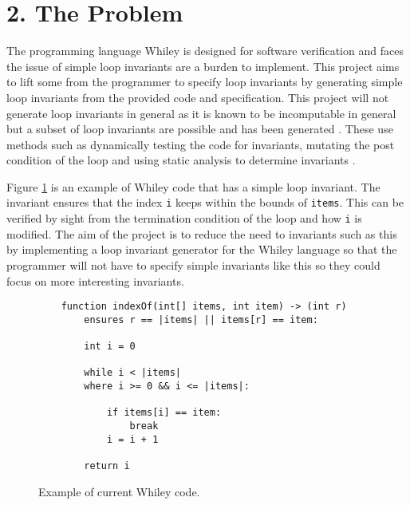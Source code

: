 \documentclass[11pt, a4paper, twoside, openright]{report}
\newcommand{\code}[1]{\texttt{#1}}
\begin{document}

\section*{2. The Problem}




The programming language Whiley is designed for software verification \cite{whiley-design} and
faces the issue of simple loop invariants are a burden to implement.
This project aims to lift some from the programmer to specify loop invariants
by generating simple loop invariants from the provided code and specification.
This project will not generate loop invariants in general as it is known to be incomputable
in general but a subset of loop invariants are possible and has been generated \cite{infer-dynamic} \cite{infer-postconditions}.
These use methods such as dynamically testing the code for invariants, mutating the post condition of the loop
and using static analysis to determine invariants \cite{infer-dynamic} \cite{infer-postconditions}.

Figure \ref{fig:whiley-ex-1} is an example of Whiley code that has a simple loop invariant.
The invariant ensures that the index \code{i} keeps within the bounds of \code{items}.
This can be verified by sight from the termination condition of the loop and how \code{i} is modified.
The aim of the project is to reduce the need to invariants such as this by implementing
a loop invariant generator for the Whiley language so that the programmer will not have
to specify simple invariants like this so they could focus on more interesting invariants.

\begin{figure}[h]
    \begin{lstlisting}
    function indexOf(int[] items, int item) -> (int r)
        ensures r == |items| || items[r] == item:

        int i = 0

        while i < |items|
        where i >= 0 && i <= |items|:

            if items[i] == item:
                break
            i = i + 1

        return i
    \end{lstlisting}
    \caption{Example of current Whiley code.}
    \label{fig:whiley-ex-1}
\end{figure}
\end{document}
